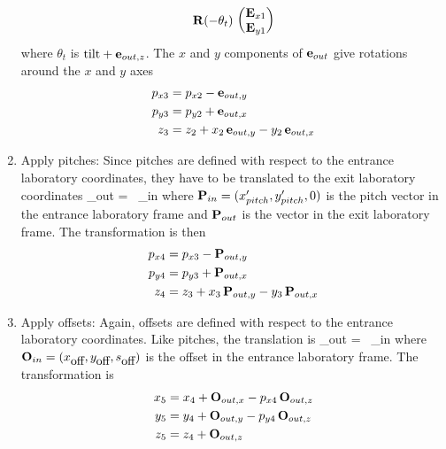 \begin{enumerate}
\begin{align}
    {\bf R} (-\theta_{t}) \,   \begin{pmatrix} {\bf E}_{x1} \\ {\bf E}_{y1} \end{pmatrix} \nonumber
\end{align}
where $\theta_t$ is $\mbox{tilt} + {\bf e}_{out,z}$. The $x$ and $y$ components
of ${\bf e}_{out}$ give rotations around the $x$ and $y$ axes
\begin{align}
  p_{x3} &= p_{x2} - {\bf e}_{out,y} \nonumber \\
  p_{y3} &= p_{y2} + {\bf e}_{out,x} \\
  z_3    &= z_2 + x_2 \, {\bf e}_{out,y} - y_2 \, {\bf e}_{out,x}
\end{align}
  \item
Apply pitches: Since pitches are defined with
respect to the entrance laboratory coordinates, they have to be
translated to the exit laboratory coordinates
\Begineq
  \bfP_{out} = \bfS \, \bfP_{in}
\Endeq
where ${\bf P}_{in} = (x'_{pitch}, y'_{pitch}, 0)$ is the pitch vector in
the entrance laboratory frame and ${\bf P}_{out}$ is the vector in the exit
laboratory frame. The transformation is then
\begin{align}
  p_{x4} &= p_{x3} - {\bf P}_{out,y} \nonumber \\
  p_{y4} &= p_{y3} + {\bf P}_{out,x} \\
  z_4    &= z_3 + x_3 \, {\bf P}_{out,y} - y_3 \, {\bf P}_{out,x}
\end{align}
  \item
Apply offsets: Again, offsets are defined with respect to the
entrance laboratory coordinates. Like pitches, the translation is
\Begineq
  \bfO_{out} = \bfS \, \bfO_{in}
\Endeq
where ${\bf O}_{in} = (x_{\mbox{off}}, y_{\mbox{off}}, s_{\mbox{off}})$ is the offset in the
entrance laboratory frame. The transformation is
\begin{align}
  x_5 &= x_4 + {\bf O}_{out,x} - p_{x4} \, {\bf O}_{out,z} \nonumber \\
  y_5 &= y_4 + {\bf O}_{out,y} - p_{y4} \, {\bf O}_{out,z} \\
  z_5 &= z_4 + {\bf O}_{out,z} 
\end{align}
  \end{enumerate}


